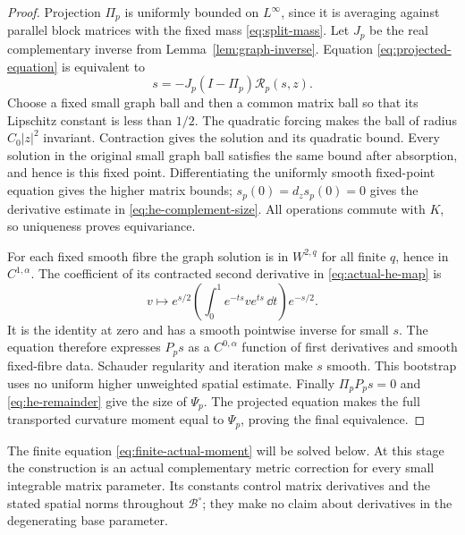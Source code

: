 \begin{proof}
Projection $\Pi_p$ is uniformly bounded on $L^\infty$,
since it is averaging against parallel block matrices
with the fixed mass \eqref{eq:split-mass}.
Let $J_p$ be the real complementary inverse from
Lemma~\ref{lem:graph-inverse}. Equation
\eqref{eq:projected-equation} is equivalent to
\[
       s=-J_p(I-\Pi_p)\mathcal R_p(s,z).
\]
Choose a fixed small graph ball and then a common matrix
ball so that its Lipschitz constant is less than $1/2$.
The quadratic forcing makes the ball of radius
$C_0|z|^2$ invariant. Contraction gives the solution and
its quadratic bound. Every solution in the original
small graph ball satisfies the same bound after
absorption, and hence is this fixed point.
Differentiating the uniformly smooth fixed-point equation
gives the higher matrix bounds; $s_p(0)=d_zs_p(0)=0$
gives the derivative estimate in
\eqref{eq:he-complement-size}. All operations commute
with $K$, so uniqueness proves equivariance.

For each fixed smooth fibre the graph solution is in
$W^{2,q}$ for all finite $q$, hence in $C^{1,\alpha}$.
The coefficient of its contracted second derivative in
\eqref{eq:actual-he-map} is
\[
 v\longmapsto e^{s/2}
       \left(\int_0^1 e^{-ts}v e^{ts}\,\dd t\right)e^{-s/2}.
\]
It is the identity at zero and has a smooth pointwise
inverse for small $s$. The equation therefore expresses
$P_ps$ as a $C^{0,\alpha}$ function of first derivatives
and smooth fixed-fibre data. Schauder regularity and
iteration make $s$ smooth. This bootstrap uses no uniform
higher unweighted spatial estimate. Finally
$\Pi_pP_ps=0$ and \eqref{eq:he-remainder} give the size
of $\Psi_p$. The projected equation makes the full
transported curvature moment equal to $\Psi_p$, proving
the final equivalence.
\end{proof}

The finite equation \eqref{eq:finite-actual-moment} will
be solved below. At this stage the construction is an
actual complementary metric correction for every small
integrable matrix parameter. Its constants control matrix
derivatives and the stated spatial norms throughout
$\mathcal B^\circ$; they make no claim about derivatives
in the degenerating base parameter.
